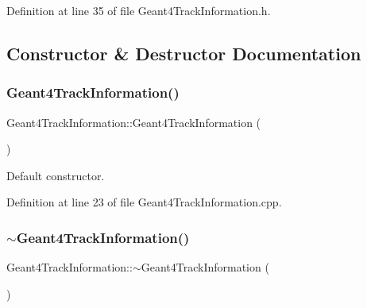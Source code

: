 Definition at line 35 of file Geant4\+Track\+Information.\+h.



\subsection{Constructor \& Destructor Documentation}
\hypertarget{class_d_d4hep_1_1_simulation_1_1_geant4_track_information_af654942e019813e21dd67c40cb964067}{}\label{class_d_d4hep_1_1_simulation_1_1_geant4_track_information_af654942e019813e21dd67c40cb964067} 
\subsubsection{\texorpdfstring{Geant4\+Track\+Information()}{Geant4TrackInformation()}}
{\footnotesize\ttfamily Geant4\+Track\+Information\+::\+Geant4\+Track\+Information (\begin{DoxyParamCaption}{ }\end{DoxyParamCaption})}



Default constructor. 



Definition at line 23 of file Geant4\+Track\+Information.\+cpp.

\hypertarget{class_d_d4hep_1_1_simulation_1_1_geant4_track_information_a6867e8c464d4584ce8c3bb7f4041b504}{}\label{class_d_d4hep_1_1_simulation_1_1_geant4_track_information_a6867e8c464d4584ce8c3bb7f4041b504} 
\subsubsection{\texorpdfstring{$\sim$\+Geant4\+Track\+Information()}{~Geant4TrackInformation()}}
{\footnotesize\ttfamily Geant4\+Track\+Information\+::$\sim$\+Geant4\+Track\+Information (\begin{DoxyParamCaption}{ }\end{DoxyParamCaption})\hspace{0.3cm}{\ttfamily [virtual]}}



